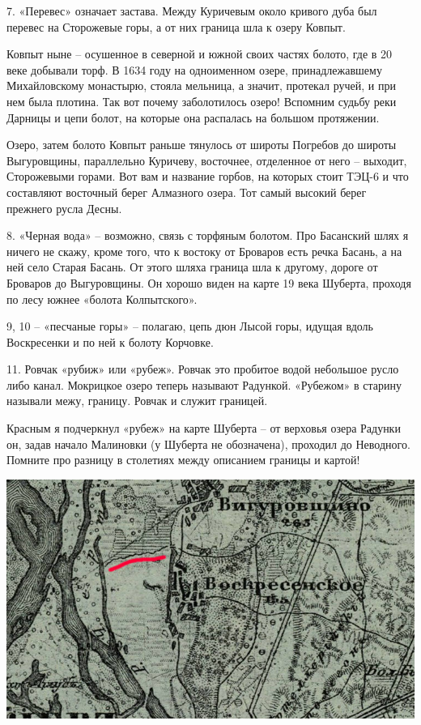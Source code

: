 7. «Перевес» означает застава. Между Куричевым около кривого дуба был перевес на Сторожевые горы, а от них граница шла к озеру Ковпыт.

Ковпыт ныне – осушенное в северной и южной своих частях болото, где в 20 веке добывали торф. В 1634 году на одноименном озере, принадлежавшему Михайловскому монастырю, стояла мельница, а значит, протекал ручей, и при нем была плотина. Так вот почему заболотилось озеро! Вспомним судьбу реки Дарницы и цепи болот, на которые она распалась на большом протяжении. 

Озеро, затем болото Ковпыт раньше тянулось от широты Погребов до широты Выгуровщины, параллельно Куричеву, восточнее, отделенное от него – выходит, Сторожевыми горами. Вот вам и название горбов, на которых стоит ТЭЦ-6 и что составляют восточный берег Алмазного озера. Тот самый высокий берег прежнего русла Десны.

8. «Черная вода» – возможно, связь с торфяным болотом. Про Басанский шлях я ничего не скажу, кроме того, что к востоку от Броваров есть речка Басань, а на ней село Старая Басань. От этого шляха граница шла к другому, дороге от Броваров до Выгуровщины. Он хорошо виден на карте 19 века Шуберта, проходя по лесу южнее «болота Колпытского».

9, 10 – «песчаные горы» – полагаю, цепь дюн Лысой горы, идущая вдоль Воскресенки и по ней к болоту Корчовке.

11. Ровчак «рубиж» или «рубеж». Ровчак это пробитое водой небольшое русло либо канал. Мокрицкое озеро теперь называют Радункой. «Рубежом» в старину называли межу, границу. Ровчак и служит границей.

Красным я подчеркнул «рубеж» на карте Шуберта – от верховья озера Радунки он, задав начало Малиновки (у Шуберта не обозначена), проходил до Неводного. Помните про разницу в столетиях между описанием границы и картой!

\begin{center}
\includegraphics[width=\linewidth]{chast-gorodki/star-ist/rubij.jpg}
\end{center}

